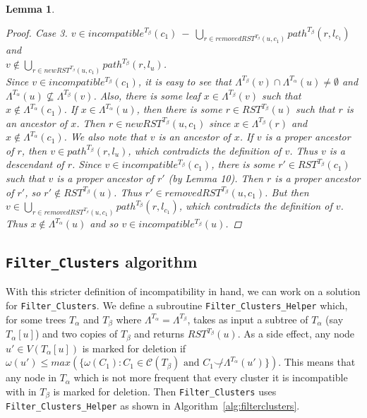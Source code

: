 \documentclass{article}
\newcommand{\compatible}{\smile}
\newcommand{\leafset}{\Lambda}
\newcommand{\weight}{\omega}
\newcommand{\TA}{T_\alpha}
\newcommand{\TB}{T_\beta}
\newtheorem{incompatibilityrecursive}[incompatibility]{Lemma}
\begin{document}
\begin{incompatibilityrecursive}
\begin{proof}
            \textit{Case 3.} $v \in incompatible^{\TB}(c_1)\ -\ \bigcup_{r \in removedRST^{\TB}(u, c_1)} path^{\TB}(r, l_{c_1})$ and\\[0.25em] %
            $v \not\in \bigcup_{r \in newRST^{\TB}(u, c_1)} path^{\TB}(r, l_u)$.\\[0.25em]
            Since $v \in incompatible^{\TB}(c_1)$, it is easy to see that $\leafset^{\TB}(v) \cap \leafset^{\TA}(u) \neq \emptyset$ and $\leafset^{\TA}(u) \not\subseteq \leafset^{\TB}(v)$. Also, there is some leaf $x \in \leafset^{\TB}(v)$ such that $x \not\in \leafset^{\TA}(c_1)$. If $x \in \leafset^{\TA}(u)$, then there is some $r \in RST^{\TB}(u)$ such that $r$ is an ancestor of $x$. Then $r \in newRST^{\TB}(u, c_1)$ since $x \in \leafset^{\TB}(r)$ and $x \not\in \leafset^{\TA}(c_1)$. We also note that $v$ is an ancestor of $x$. If $v$ is a proper ancestor of $r$, then $v \in path^{\TB}(r, l_u)$, which contradicts the definition of $v$. Thus $v$ is a descendant of $r$. Since $v \in incompatible^{\TB}(c_1)$, there is some $r' \in RST^{\TB}(c_1)$ such that $v$ is a proper ancestor of $r'$ (by Lemma 10). Then $r$ is a proper ancestor of $r'$, so $r' \not\in RST^{\TB}(u)$. Thus $r' \in removedRST^{\TB}(u, c_1)$. But then $v \in \bigcup_{r \in removedRST^{\TB}(u, c_1)} path^{\TB}(r, l_{c_1})$, which contradicts the definition of $v$. Thus $x \not\in \leafset^{\TA}(u)$ and so $v \in incompatible^{\TB}(u)$.
        \end{proof}
    \end{incompatibilityrecursive}


    \subsection{\texttt{Filter\_Clusters} algorithm}
    \label{subsec:filterclustersalgorithm}

    With this stricter definition of incompatibility in hand, we can work on a solution for \texttt{Filter\_Clusters}. We define a subroutine \texttt{Filter\_Clusters\_Helper} which, for some trees $\TA$ and $\TB$ where $\leafset^{\TA} = \leafset^{\TB}$, takes as input a subtree of $\TA$ (say $\TA[u]$) and two copies of $\TB$ and returns $RST^{\TB}(u)$. As a side effect, any node $u' \in V(\TA[u])$ is marked for deletion if $\weight(u') \leq max(\{\weight(C_1) : C_1 \in \mathcal{C}(\TB) \text{ and } C_1 \not\compatible \leafset^{\TA}(u')\})$. This means that any node in $\TA$ which is not more frequent that every cluster it is incompatible with in $\TB$ is marked for deletion. Then \texttt{Filter\_Clusters} uses \texttt{Filter\_Clusters\_Helper} as shown in Algorithm~\ref{alg:filterclusters}.
\end{document}
